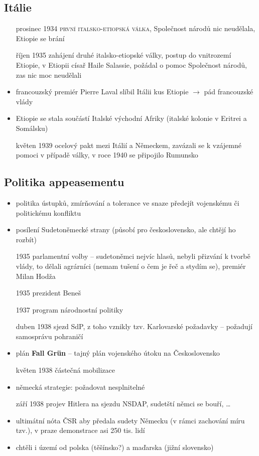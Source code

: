 \documentclass{article}
\begin{document}
\subsection*{Itálie}
\begin{itemize}
    \item[prosinec 1934] \textsc{první italsko-etiopská válka}, Společnost národů nic neudělala, Etiopie se brání
    \item[říjen 1935] zahájení druhé italsko-etiopské války, postup do vnitrozemí Etiopie, v Etiopii císař Haile Salassie, požádal o pomoc Společnost národů, zas nic moc neudělali
    \item francouzský premiér Pierre Laval slíbil Itálii kus Etiopie $\rightarrow$ pád francouzské vlády
    \item Etiopie se stala součástí Italské východní Afriky (italské kolonie v Eritrei a Somálsku)
    \item[květen 1939] ocelový pakt mezi Itálií a Německem, zavázali se k vzájemné pomoci v případě války, v roce 1940 se připojilo Rumunsko
\end{itemize}

\subsection*{Politika appeasementu}
\begin{itemize}
    \item politika ústupků, zmírňování a tolerance ve snaze předejít vojenskému či politickému konfliktu
    \item posílení Sudetoněmecké strany (působí pro československo, ale chtějí ho rozbít)
    \item[1935] parlamentní volby -- sudetoněmci nejvíc hlasů, nebyli přizvání k tvorbě vlády, to dělali agrárníci (nemam tušení o čem je řeč a stydím se), premiér Milan Hodža
    \item[1935] prezident Beneš
    \item[1937] program národnostní politiky
    \item[duben 1938] sjezd SdP, z toho vznikly tzv. Karlovarské požadavky -- požadují samosprávu pohraničí
    \item plán \textbf{Fall Grün} -- tajný plán vojenského útoku na Československo
    \item[květen 1938] částečná mobilizace
    \item německá strategie: požadovat nesplnitelné
    \item[září 1938] projev Hitlera na sjezdu NSDAP, sudetští němci se bouří, \dots
    \item ultimátní nóta ČSR aby předala sudety Německu (v rámci zachování míru tzv.), v praze demonstrace asi 250 tis. lidí
    \item chtěli i území od polska (těšínsko?) a maďarska (jižní slovensko)
\end{itemize}
\end{document}
